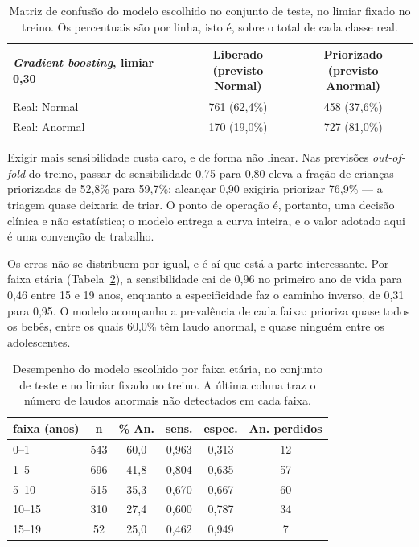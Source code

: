 \documentclass[conference]{IEEEtran}
\begin{document}
\begin{table}[!t]
\caption{Matriz de confusão do modelo escolhido no conjunto de teste, no limiar fixado no treino. Os percentuais são por linha, isto é, sobre o total de cada classe real.}
\label{tab:confusao}
\centering
\footnotesize
\begin{tabular}{>{\raggedright\arraybackslash}p{2.3cm}cc}
\toprule
\textit{Gradient boosting}, limiar 0,30 & \shortstack{Liberado\\(previsto Normal)} & \shortstack{Priorizado\\(previsto Anormal)} \\
\midrule
Real: Normal & 761 (62,4\%) & 458 (37,6\%) \\
Real: Anormal & 170 (19,0\%) & 727 (81,0\%) \\
\bottomrule
\end{tabular}
\end{table}

Exigir mais sensibilidade custa caro, e de forma não linear. Nas previsões \textit{out-of-fold} do treino, passar de sensibilidade 0,75 para 0,80 eleva a fração de crianças priorizadas de 52,8\% para 59,7\%; alcançar 0,90 exigiria priorizar 76,9\% --- a triagem quase deixaria de triar. O ponto de operação é, portanto, uma decisão clínica e não estatística; o modelo entrega a curva inteira, e o valor adotado aqui é uma convenção de trabalho.

Os erros não se distribuem por igual, e é aí que está a parte interessante. Por faixa etária (Tabela~\ref{tab:faixa}), a sensibilidade cai de 0,96 no primeiro ano de vida para 0,46 entre 15 e 19 anos, enquanto a especificidade faz o caminho inverso, de 0,31 para 0,95. O modelo acompanha a prevalência de cada faixa: prioriza quase todos os bebês, entre os quais 60,0\% têm laudo anormal, e quase ninguém entre os adolescentes.

\begin{table}[!t]
\caption{Desempenho do modelo escolhido por faixa etária, no conjunto de teste e no limiar fixado no treino. A última coluna traz o número de laudos anormais não detectados em cada faixa.}
\label{tab:faixa}
\centering
\footnotesize
\begin{tabular}{lccccc}
\toprule
faixa (anos) & n & \% An. & sens. & espec. & An. perdidos \\
\midrule
0--1 & 543 & 60,0 & 0,963 & 0,313 & 12 \\
1--5 & 696 & 41,8 & 0,804 & 0,635 & 57 \\
5--10 & 515 & 35,3 & 0,670 & 0,667 & 60 \\
10--15 & 310 & 27,4 & 0,600 & 0,787 & 34 \\
15--19 & 52 & 25,0 & 0,462 & 0,949 & 7 \\
\bottomrule
\end{tabular}
\end{table}
\end{document}
